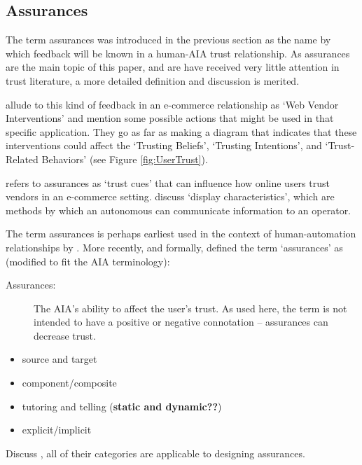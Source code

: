 \subsection{Assurances}
    The term assurances was introduced in the previous section as the name by which feedback will be known in a human-AIA trust relationship. As assurances are the main topic of this paper, and are have received very little attention in trust literature, a more detailed definition and discussion is merited.

    \citet{McKnight2001-fa} allude to this kind of feedback in an e-commerce relationship as `Web Vendor Interventions' and mention some possible actions that might be used in that specific application. They go as far as making a diagram that indicates that these interventions could affect the `Trusting Beliefs', `Trusting Intentions', and `Trust-Related Behaviors' (see Figure \ref{fig:UserTrust}).

    \citet{Corritore2003-gx} refers to assurances as `trust cues' that can influence how online users trust vendors in an e-commerce setting. \citet{Lee2004-pv} discuss `display characteristics', which are methods by which an autonomous can communicate information to an operator.
    
    The term assurances is perhaps earliest used in the context of human-automation relationships by \citet{Sheridan1984-kx}. More recently, and formally, \citet{Lillard2016-yg} defined the term `assurances' as (modified to fit the AIA terminology):
    
    \begin{description}
        \item [Assurances:] The AIA's ability to affect the user's trust. As used here, the term is not intended to have a positive or negative connotation -- assurances can decrease trust.
    \end{description}

    \begin{itemize}
        \item source and target
        \item component/composite
        \item tutoring and telling (\textbf{static and dynamic??})
        \item explicit/implicit
    \end{itemize}

    Discuss \citet{Lacave2002-cu}, all of their categories are applicable to designing assurances.

